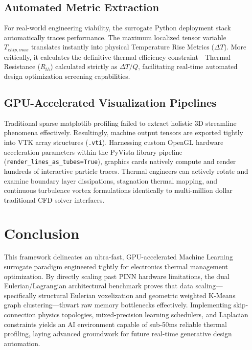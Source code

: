 \documentclass[conference]{IEEEtran}
\begin{document}
\subsection{Automated Metric Extraction}
For real-world engineering viability, the surrogate Python deployment stack automatically traces performance. The maximum localized tensor variable $T_{chip,max}$ translates instantly into physical Temperature Rise Metrics ($\Delta T$). More critically, it calculates the definitive thermal efficiency constraint—Thermal Resistance ($R_{th}$) calculated strictly as $\Delta T / Q$, facilitating real-time automated design optimization screening capabilities.

\subsection{GPU-Accelerated Visualization Pipelines}
Traditional sparse matplotlib profiling failed to extract holistic 3D streamline phenomena effectively. Resultingly, machine output tensors are exported tightly into VTK array structures (\texttt{.vti}). Harnessing custom OpenGL hardware acceleration parameters within the PyVista library pipeline (\texttt{render\_lines\_as\_tubes=True}), graphics cards natively compute and render hundreds of interactive particle traces. Thermal engineers can actively rotate and examine boundary layer dissipations, stagnation thermal mapping, and continuous turbulence vortex formulations identically to multi-million dollar traditional CFD solver interfaces.

\section{Conclusion}
This framework delineates an ultra-fast, GPU-accelerated Machine Learning surrogate paradigm engineered tightly for electronics thermal management optimization. By directly scaling past PINN hardware limitations, the dual Eulerian/Lagrangian architectural benchmark proves that data scaling—specifically structural Eulerian voxelization and geometric weighted K-Means graph clustering—thwart raw memory bottlenecks effectively. Implementing skip-connection physics topologies, mixed-precision learning schedulers, and Laplacian constraints yields an AI environment capable of sub-50ms reliable thermal profiling, laying advanced groundwork for future real-time generative design automation.
\end{document}
